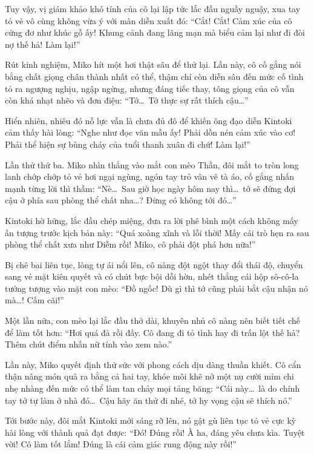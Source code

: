 \documentclass[../main.tex]{subfiles}
\begin{document}
Tuy vậy, vị giám khảo khó tính của cô lại lập tức lắc đầu nguầy nguậy, xua tay tỏ vẻ vô cùng không vừa ý với màn diễn xuất đó: ``Cắt! Cắt! Cảm xúc của cô cứng đơ như khúc gỗ ấy! Khung cảnh đang lãng mạn mà biểu cảm lại như đi đòi nợ thế hả! Làm lại!''

\il

Rút kinh nghiệm, Miko hít một hơi thật sâu để thử lại. Lần này, cô cố gắng nói bằng chất giọng chân thành nhất có thể, thậm chí còn diễn sâu đến mức cố tình tỏ ra ngượng nghịu, ngập ngừng, nhưng đáng tiếc thay, tông giọng của cô vẫn còn khá nhạt nhẽo và đơn điệu: ``Tớ\dots\ Tớ thực sự rất thích cậu\dots''

Hiển nhiên, nhiêu đó nỗ lực vẫn là chưa đủ đô để khiến ông đạo diễn Kintoki cảm thấy hài lòng: ``Nghe như đọc văn mẫu ấy! Phải dồn nén cảm xúc vào cơ! Phải thể hiện sự bùng cháy của tuổi thanh xuân đi chứ! Làm lại!''

\il

Lần thử thứ ba. Miko nhìn thẳng vào mắt con mèo Thần, đôi mắt to tròn long lanh chớp chớp tỏ vẻ hơi ngại ngùng, ngón tay trỏ vân vê tà áo, cố gắng nhấn mạnh từng lời thì thầm: ``Nè\dots\ Sau giờ học ngày hôm nay thì\dots\ tớ sẽ đứng đợi cậu ở phía sau phòng thể chất nha\dots? Đừng có không tới đó\dots''

Kintoki hờ hững, lắc đầu chép miệng, đưa ra lời phê bình một cách không mấy ấn tượng trước kịch bản này: ``Quá xoàng xĩnh và lỗi thời! Mấy cái trò hẹn ra sau phòng thể chất xưa như Diễm rồi! Miko, cô phải đột phá hơn nữa!''

\il

Bị chê bai liên tục, lòng tự ái nổi lên, cô nàng đột ngột thay đổi thái độ, chuyển sang vẻ mặt kiên quyết và có chút bực bội dỗi hờn, nhét thẳng cái hộp sô-cô-la tưởng tượng vào mặt con mèo: ``Đồ ngốc! Dù gì thì tớ cũng phải bắt cậu nhận nó mà\dots! Cấm cãi!''

Một lần nữa, con mèo lại lắc đầu thở dài, khuyên nhủ cô nàng nên biết tiết chế để làm tốt hơn: ``Hơi quá đà rồi đấy. Cô đang đi tỏ tình hay đi trấn lột thế hả? Thêm chút điểm nhấn nữ tính vào xem nào.''

\il

Lần này, Miko quyết định thử sức với phong cách dịu dàng thuần khiết. Cô cẩn thận nâng món quà ra bằng cả hai tay, khóe môi khẽ nở một nụ cười mỉm chi nhẹ nhàng đến mức có thể làm tan chảy mọi tảng băng: ``Cái này\dots\ là do chính tay tớ tự làm ở nhà đó\dots\ Cậu hãy ăn thử đi nhé, tớ hy vọng cậu sẽ thích nó.''

Tới bước này, đôi mắt Kintoki mới sáng rỡ lên, nó gật gù liên tục tỏ vẻ cực kỳ hài lòng với thành quả đạt được: ``Đó! Đúng rồi! À ha, đáng yêu chưa kìa. Tuyệt vời! Cô làm tốt lắm! Đúng là cái cảm giác rung động này rồi!''
\end{document}

